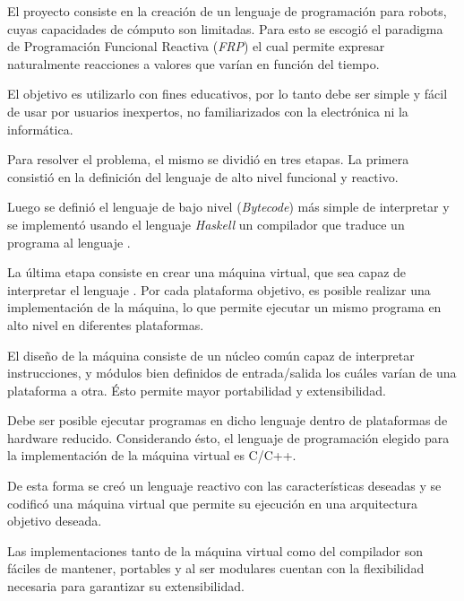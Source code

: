 
  El proyecto consiste en la creación de un lenguaje de programación
para robots, cuyas capacidades de cómputo son limitadas.
  Para esto se escogió el paradigma de Programación Funcional Reactiva
(\emph{FRP}) el cual permite expresar naturalmente reacciones a
valores que varían en función del tiempo.

  El objetivo es utilizarlo con fines educativos,
por lo tanto debe ser simple y fácil de usar por usuarios
inexpertos, no familiarizados con la electrónica ni la informática.

  Para resolver el problema, el mismo se dividió en tres etapas.  
  La primera consistió en la definición del lenguaje \frob{} de alto
nivel funcional y reactivo.

  Luego se definió el lenguaje \alf{} de bajo nivel (\emph{Bytecode}) más
simple de interpretar y se implementó usando el lenguaje \textit{Haskell} un
compilador que traduce un programa \frob{} al lenguaje \alf{}.

  La última etapa consiste en crear una máquina virtual, que
sea capaz de interpretar el lenguaje \alf{}.
  Por cada plataforma objetivo, es posible realizar una implementación de
la máquina, lo que permite ejecutar un mismo programa en alto nivel en
diferentes plataformas.

  El diseño de la máquina consiste de un núcleo común capaz de interpretar
instrucciones, y módulos bien definidos de
entrada/salida los cuáles varían de una plataforma a otra.
  Ésto permite mayor portabilidad y extensibilidad.

  Debe ser posible ejecutar programas en dicho lenguaje dentro de plataformas
de hardware reducido.
  Considerando ésto, el lenguaje de programación elegido para la
implementación de la máquina virtual es C/C++.

  De esta forma se creó un lenguaje reactivo con las
características deseadas y se codificó una máquina
virtual que permite su ejecución en una arquitectura objetivo deseada.

  Las implementaciones tanto de la máquina virtual como del compilador
son fáciles de mantener, portables y al ser modulares
cuentan con la flexibilidad necesaria para garantizar su extensibilidad.
